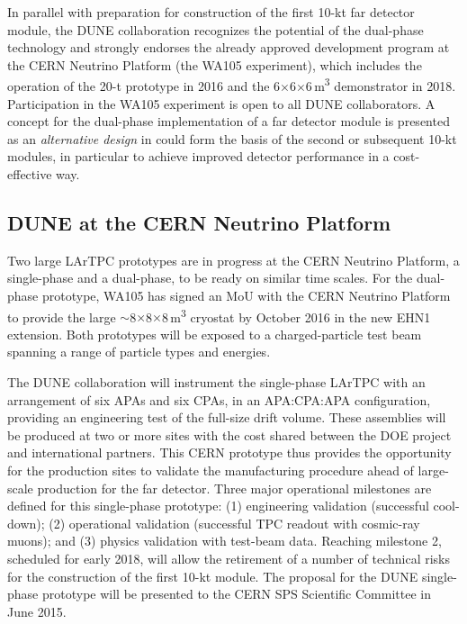 In parallel with preparation for construction of the first 10-kt far detector module, 
the DUNE collaboration recognizes the potential of the dual-phase technology and 
strongly endorses the already approved development program at the CERN Neutrino 
Platform (the WA105 experiment), which includes the operation of the 20-t prototype 
in 2016 and the 6$\times$6$\times$6\,m\textsuperscript{3} demonstrator in 2018. Participation 
in the WA105 experiment is open to all DUNE collaborators. A concept for the dual-phase 
implementation of a far detector module is presented as an \textit{alternative 
design} in %
could form the basis of the second or subsequent 10-kt modules, in 
particular to achieve improved detector performance in a cost-effective way. 

\subsection{DUNE at the CERN Neutrino Platform}
\label{v1ch3:dune-at-cern}

Two large LArTPC prototypes are in progress at the CERN Neutrino Platform, a single-phase and a dual-phase, to be ready on similar time scales. 
For the dual-phase prototype, WA105 has signed an MoU with the CERN Neutrino Platform to provide the large 
$\sim$8$\times$8$\times$8\,m\textsuperscript{3} cryostat by October 2016 in the new EHN1 extension. 
Both prototypes will be exposed to a charged-particle test 
beam spanning a range of particle types and energies.  

The DUNE collaboration will instrument %
the single-phase LArTPC with an arrangement 
of six APAs and six CPAs, in an APA:CPA:APA configuration, providing an engineering 
test of the full-size drift volume. These assemblies will be produced at two or more sites with the cost 
shared between the DOE project and international partners. This CERN prototype thus 
provides the opportunity for the production sites to validate the manufacturing 
procedure ahead of large-scale production for the far detector. Three major operational 
milestones are defined for this single-phase prototype: (1) engineering validation 
(successful cool-down); (2) operational validation (successful TPC readout with 
cosmic-ray muons); and (3) physics validation with test-beam data. Reaching milestone 
2, scheduled for early 2018, will allow the retirement of a number of technical 
risks for the construction of the first 10-kt module. The proposal for the DUNE 
single-phase prototype will be presented to the CERN SPS Scientific Committee in June 2015. 

